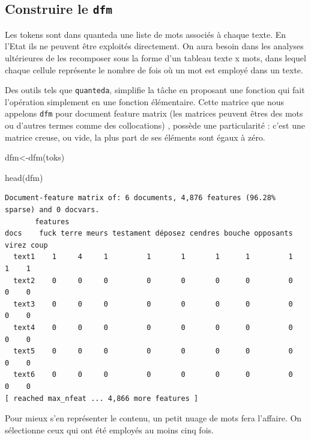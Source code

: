 \documentclass[
  letterpaper,
  DIV=11,
  numbers=noendperiod]{scrreprt}
\newenvironment{Shaded}{\begin{snugshade}}{\end{snugshade}}
\newcommand{\FunctionTok}[1]{\textcolor[rgb]{0.28,0.35,0.67}{#1}}
\newcommand{\NormalTok}[1]{\textcolor[rgb]{0.00,0.23,0.31}{#1}}
\newcommand{\OtherTok}[1]{\textcolor[rgb]{0.00,0.23,0.31}{#1}}
\begin{document}
\subsection{\texorpdfstring{Construire le
\texttt{dfm}}{Construire le dfm}}\label{construire-le-dfm}

Les tokens sont dans quanteda une liste de mots associés à chaque texte.
En l'Etat ils ne peuvent être exploités directement. On aura besoin dans
les analyses ultérieures de les recomposer sous la forme d'un tableau
texte x mots, dans lequel chaque cellule représente le nombre de fois où
un mot est employé dans un texte.

Des outils tels que \texttt{quanteda}, simplifie la tâche en proposant
une fonction qui fait l'opération simplement en une fonction
élémentaire. Cette matrice que nous appelons \texttt{dfm} pour document
feature matrix (les matrices peuvent êtres des mots ou d'autres termes
comme des collocations) , possède une particularité : c'est une matrice
creuse, ou vide, la plus part de ses éléments sont égaux à zéro.

\begin{Shaded}
\begin{Highlighting}[]
\NormalTok{dfm}\OtherTok{\textless{}{-}}\FunctionTok{dfm}\NormalTok{(toks)}

\FunctionTok{head}\NormalTok{(dfm)}
\end{Highlighting}
\end{Shaded}

\begin{verbatim}
Document-feature matrix of: 6 documents, 4,876 features (96.28% sparse) and 0 docvars.
       features
docs    fuck terre meurs testament déposez cendres bouche opposants virez coup
  text1    1     4     1         1       1       1      1         1     1    1
  text2    0     0     0         0       0       0      0         0     0    0
  text3    0     0     0         0       0       0      0         0     0    0
  text4    0     0     0         0       0       0      0         0     0    0
  text5    0     0     0         0       0       0      0         0     0    0
  text6    0     0     0         0       0       0      0         0     0    0
[ reached max_nfeat ... 4,866 more features ]
\end{verbatim}

Pour mieux s'en représenter le contenu, un petit nuage de mots fera
l'affaire. On sélectionne ceux qui ont été employés au moins cinq fois.
\end{document}
